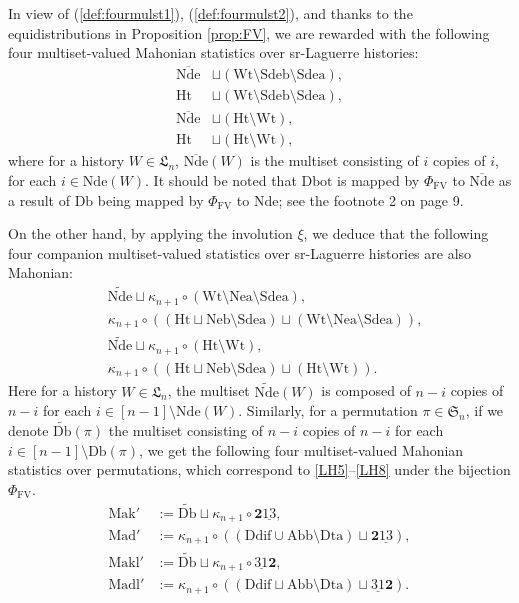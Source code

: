 \documentclass[12pt]{amsart}
\numberwithin{equation}{section}
\theoremstyle{plain}
\theoremstyle{definition}
\def\FV{\mathrm{FV}}
\def\SS{\mathfrak{S}}
\def\LH{\mathfrak{L}}
\def\Neb{\mathrm{Neb}}
\def\Nea{\mathrm{Nea}}
\def\Sdeb{\mathrm{Sdeb}}
\def\Sdea{\mathrm{Sdea}}
\def\Nde{\mathrm{Nde}}
\def\Het{\mathrm{Ht}}
\def\Wt{\mathrm{Wt}}
\def\Db{\mathrm{Db}}
\def\Ddif{\mathrm{Ddif}}
\def\Dbot{\mathrm{Dbot}}
\def\Dta{\mathrm{Dta}}
\def\Abb{\mathrm{Abb}}
\def\rightascent{{\mathbf{2}\underline{13}}}
\def\leftdescent{\mathrm{\underline{31}}\mathbf{2}}
\def\Mak{\mathrm{Mak}}
\def\Mad{\mathrm{Mad}}
\def\Makl{\mathrm{Makl}}
\def\Madl{\mathrm{Madl}}
\begin{document}
In view of (\ref{def:fourmulst1}), (\ref{def:fourmulst2}), and thanks to the equidistributions in Proposition \ref{prop:FV}, we are rewarded with the following four multiset-valued Mahonian statistics over sr-Laguerre
histories:
\begin{align}
\label{LH1}\overline{\Nde} &\sqcup (\Wt \setminus \Sdeb \setminus \Sdea),\\
\label{LH2}\Het &\sqcup (\Wt \setminus \Sdeb \setminus \Sdea),  \\
\label{LH3}\overline{\Nde} &\sqcup   (\Het \setminus \Wt),    \\
\label{LH4}\Het &\sqcup   (\Het \setminus \Wt),
\end{align}
where for a history $W\in\LH_n$, $\overline{\Nde}(W)$ is the multiset consisting of $i$ copies of $i$, for each $i \in \Nde(W)$. It should be noted that $\Dbot$ is mapped by $\Phi_{\FV}$
to $\overline{\Nde}$ as a result of $\Db$ being mapped by $\Phi_{\FV}$
to $\Nde$; see the footnote 2 on page 9.

On the other hand, by applying the involution $\xi$, we deduce that the following four companion multiset-valued statistics over sr-Laguerre histories are also Mahonian:
\begin{align}
\label{LH5} &\widetilde{\Nde }\sqcup \kappa_{n+1}\circ(\Wt \setminus \Nea \setminus \Sdea),\\
\label{LH6} &\kappa_{n+1}\circ((\Het \sqcup \Neb \setminus \Sdea)\sqcup (\Wt \setminus
\Nea \setminus \Sdea)),  \\
\label{LH7} &\widetilde{\Nde } \sqcup \kappa_{n+1}\circ(\Het \setminus \Wt),\\
\label{LH8} &\kappa_{n+1}\circ((\Het \sqcup \Neb \setminus \Sdea) \sqcup (\Het \setminus \Wt)).
\end{align}
Here for a history $W\in\LH_n$, the multiset $\widetilde{\Nde}(W)$ is composed of $n-i$ copies of $n-i$ for each $i \in [n-1]\setminus\Nde(W)$. Similarly, for a permutation $\pi\in\SS_n$, if we denote $\widetilde{\Db}(\pi)$ the multiset consisting of $n-i$ copies of $n-i$ for each $i\in[n-1]\setminus\Db(\pi)$, we get the following four multiset-valued Mahonian statistics over permutations, which correspond to \eqref{LH5}--\eqref{LH8} under the bijection $\Phi_{\FV}$.
\begin{align*}
\Mak' &:=\widetilde{\Db} \sqcup \kappa_{n+1}\circ\rightascent,\\
\Mad' &:=\kappa_{n+1}\circ((\Ddif\cup\Abb\setminus\Dta) \sqcup \rightascent),\\
\Makl' &:=\widetilde{\Db} \sqcup \kappa_{n+1}\circ\leftdescent,\\
\Madl' &:=\kappa_{n+1}\circ((\Ddif\sqcup\Abb\setminus\Dta) \sqcup \leftdescent).
\end{align*}
\end{document}
